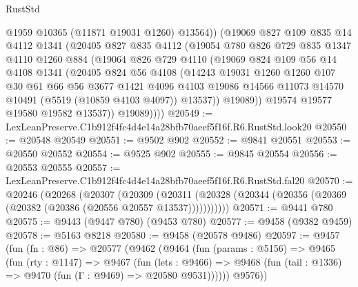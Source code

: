 \begin{lexlean}{RustStd}
\begin{coremodule}
              @1959
              @10365
              (@11871 @19031 @1260)
              @13564))
          (@19069
            @827
            @109
            @835
            @14
            @4112
            @1341
            (@20405
              @827
              @835
              @4112
              (@19054
                @780
                @826
                @729
                @835
                @1347
                @4110
                @1260
                @884
                (@19064
                  @826
                  @729
                  @4110
                  (@19069
                    @824
                    @109
                    @56
                    @14
                    @4108
                    @1341
                    (@20405
                      @824
                      @56
                      @4108
                      (@14243
                        @19031
                        @1260
                        @1260
                        @107
                        @30
                        @61
                        @66
                        @56
                        @3677
                        @1421
                        @4096
                        @4103
                        @19086
                        @14566
                        @11073
                        @14570
                        @10491
                        (@5519 (@10859 @4103 @4097))
                        @13537))
                    @19089))
                @19574
                @19577
                @19580
                @19582
                @13537))
            @19089))))
@20549 := LexLeanPreserve.C1b912f4fc4d4e14a28bfb70aeef5f16f.R6.RustStd.look20
@20550 := @20548 @20549
@20551 := @9502 @902
@20552 := @9841 @20551
@20553 := @20550 @20552
@20554 := @9525 @902
@20555 := @9845 @20554
@20556 := @20553 @20555
@20557 := LexLeanPreserve.C1b912f4fc4d4e14a28bfb70aeef5f16f.R6.RustStd.fal20
@20570 := @20246
    (@20268
      (@20307
        (@20309
          (@20311 (@20328 (@20344 (@20356 (@20369 (@20382 (@20386 (@20556 @20557 @13537)))))))))))
@20571 := @9441 @780
@20575 := @9443 (@9447 @780) (@9453 @780)
@20577 := @9458 (@9382 @9459)
@20578 := @5163 @8218
@20580 := @9458 (@20578 @9486)
@20597 := @9457
    (fun (fn : @86) =>
    @20577
      (@9462
        (@9464
          (fun (params : @5156) =>
          @9465
            (fun (rty : @1147) =>
            @9467
              (fun (lets : @9466) =>
              @9468 (fun (tail : @1336) => @9470 (fun (Γ : @9469) => @20580 @9531))))))
        @9576))

\end{coremodule}
\end{lexlean}

